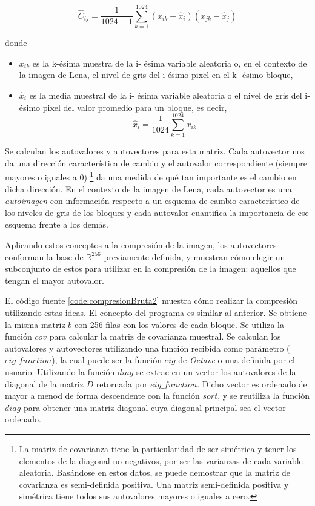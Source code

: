 \documentclass[twocolumn,a4paper,10pt]{article}
\begin{document}
\begin{equation}
    \widehat{C}_{ij} =  \frac{1}{1024 - 1}\sum_{k=1}^{1024} (x_{ik} - \widehat{x}_{i}) (x_{jk} - \widehat{x}_{j})
\end{equation}

donde
\begin{itemize}
    \item $x_{ik}$ es la k-\'esima muestra de la i- \'esima variable aleatoria o, en el contexto de la imagen de Lena, el nivel de gris del i-\'esimo pixel en el 
    k- \'esimo bloque,
    \item $\widehat{x}_{i}$ es la media muestral de la i- \'esima variable aleatoria o el nivel de gris del i-\'esimo pixel del valor promedio para un bloque, es decir,
    \begin{equation}
        \widehat{x}_{i} = \frac{1}{1024} \sum_{k=1}^{1024} x_{ik} 
    \end{equation}
\end{itemize}

Se calculan los autovalores y autovectores para esta matriz. Cada autovector nos da una direcci\'on caracter\'istica de cambio y el autovalor correspondiente 
(siempre mayores o iguales a 0) \footnote{La matriz de covarianza tiene la particularidad de ser sim\'etrica y tener los elementos de la diagonal no negativos, 
por ser las varianzas de cada variable aleatoria. Bas\'andose en estos datos, se puede demostrar que la matriz de covarianza es semi-definida positiva. 
Una matriz semi-definida positiva y sim\'etrica tiene todos sus autovalores mayores o iguales a cero.} da una medida de qu\'e tan importante es el cambio en 
dicha direcci\'on. En el contexto de la imagen de Lena, cada autovector es una \textit{autoimagen} con información respecto a un esquema de cambio caracter\'istico 
de los niveles de gris de los bloques y cada autovalor cuantifica la importancia de ese esquema frente a los dem\'as.

Aplicando estos conceptos a la compresión de la imagen, los autovectores conforman la base de $\mathbb{R}^{256}$ previamente definida, y muestran cómo 
elegir un subconjunto de estos para utilizar en la compresión de la imagen: aquellos que tengan el mayor autovalor.

El código fuente \ref{code:compresionBruta2} muestra cómo realizar la compresión utilizando estas ideas. El concepto del programa es similar al anterior. 
Se obtiene la misma matriz $b$ con 256 filas con los valores de cada bloque. Se utiliza la función $cov$ para calcular la matriz de covarianza muestral. 
Se calculan los autovalores y autovectores utilizando una función recibida como parámetro ($eig\_function$), la cual puede ser la función $eig$ de 
\textit{Octave} o una definida por el usuario. Utilizando la función $diag$ se extrae en un vector los autovalores de la diagonal de la matriz $D$ 
retornada por $eig\_function$. Dicho vector es ordenado de mayor a menod de forma descendente con la función $sort$, y se reutiliza la función $diag$ 
para obtener una matriz diagonal cuya diagonal principal sea el vector ordenado.
\end{document}
